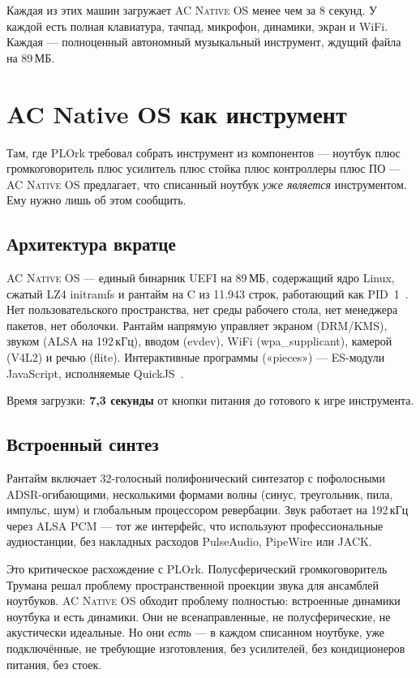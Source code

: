 \documentclass[10pt,letterpaper,twocolumn]{article}
\newcommand{\acos}{\textsc{AC Native OS}}
\begin{document}
Каждая из этих машин загружает \acos{} менее чем за 8 секунд. У каждой есть полная клавиатура, тачпад, микрофон, динамики, экран и WiFi. Каждая --- полноценный автономный музыкальный инструмент, ждущий файла на 89\,МБ.


\section{AC Native OS как инструмент}
\label{sec:instrument}

Там, где PLOrk требовал собрать инструмент из компонентов --- ноутбук плюс громкоговоритель плюс усилитель плюс стойка плюс контроллеры плюс ПО --- \acos{} предлагает, что списанный ноутбук \emph{уже является} инструментом. Ему нужно лишь об этом сообщить.

\subsection{Архитектура вкратце}

\acos{} --- единый бинарник UEFI на 89\,МБ, содержащий ядро Linux, сжатый LZ4 initramfs и рантайм на C из 11.943 строк, работающий как PID~1~\citep{scudder2026os}. Нет пользовательского пространства, нет среды рабочего стола, нет менеджера пакетов, нет оболочки. Рантайм напрямую управляет экраном (DRM/KMS), звуком (ALSA на 192\,кГц), вводом (evdev), WiFi (wpa\_supplicant), камерой (V4L2) и речью (flite). Интерактивные программы («pieces») --- ES-модули JavaScript, исполняемые QuickJS~\citep{bellard2019quickjs}.

Время загрузки: \textbf{7,3 секунды} от кнопки питания до готового к игре инструмента.

\subsection{Встроенный синтез}

Рантайм включает 32-голосный полифонический синтезатор с пофолосными ADSR-огибающими, несколькими формами волны (синус, треугольник, пила, импульс, шум) и глобальным процессором ревербации. Звук работает на 192\,кГц через ALSA PCM --- тот же интерфейс, что используют профессиональные аудиостанции, без накладных расходов PulseAudio, PipeWire или JACK.

Это критическое расхождение с PLOrk. Полусферический громкоговоритель Трумана решал проблему пространственной проекции звука для ансамблей ноутбуков. \acos{} обходит проблему полностью: встроенные динамики ноутбука и есть динамики. Они не всенаправленные, не полусферические, не акустически идеальные. Но они \emph{есть} --- в каждом списанном ноутбуке, уже подключённые, не требующие изготовления, без усилителей, без кондиционеров питания, без стоек.
\end{document}
